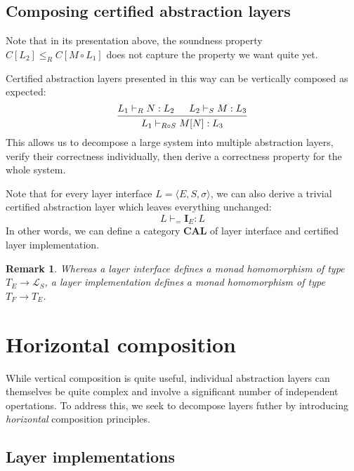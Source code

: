\documentclass[11pt,oneside,draft]{book}
\newtheorem{remark}[theorem]{Remark}
\theoremstyle{definition}
\begin{document}

\subsection{Composing certified abstraction layers} %

Note that in its presentation above,
the soundness property $C[L_2] \le_R C[M \circ L_1]$
does not capture the property we want quite yet.



Certified abstraction layers presented in this way
can be vertically composed as expected:
\[
  \begin{prooftree}
    \hypo{L_1 \vdash_R N : L_2}
    \hypo{L_2 \vdash_S M : L_3}
    \infer2{L_1 \vdash_{R \circ S} M[N] : L_3}
  \end{prooftree}
\]
This allows us to decompose a large system
into multiple abstraction layers,
verify their correctness individually,
then derive a correctness property for the whole system.

Note that for every layer interface
$L = \langle E, S, \sigma \rangle$,
we can also derive a trivial certified abstraction layer
which leaves everything unchanged:
\[
  L \vdash_{=} \mathbf{I}_E : L
\]
In other words,
we can define a category $\mathbf{CAL}$
of layer interface and certified layer implementation.

\begin{remark}
Whereas a layer interface defines
a monad homomorphism of type $T_E \rightarrow \mathcal{L}_S$,
a layer implementation defines
a monad homomorphism of type $T_F \rightarrow T_E$.
\end{remark}



\section{Horizontal composition} %

While vertical composition is quite useful,
individual abstraction layers can themselves be quite complex
and involve a significant number of independent opertations.
To address this,
we seek to decompose layers futher by introducing
\emph{horizontal} composition principles.

\subsection{Layer implementations} %
\end{document}
